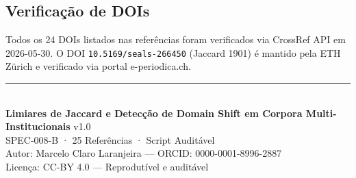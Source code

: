 \documentclass[12pt,a4paper]{article}
\theoremstyle{remark}
\begin{document}
\subsection*{Verificação de DOIs}

Todos os 24 DOIs listados nas referências foram verificados via CrossRef API em 2026-05-30. O DOI \texttt{10.5169/seals-266450} (Jaccard 1901) é mantido pela ETH Zürich e verificado via portal e-periodica.ch.

\vspace{16pt}

\begin{center}
\rule{0.5\textwidth}{0.4pt}\\[8pt]
{\small \textbf{Limiares de Jaccard e Detecção de Domain Shift em Corpora Multi-Institucionais} v1.0}\\
{\small SPEC-008-B · 25 Referências · Script Auditável}\\[4pt]
{\small Autor: Marcelo Claro Laranjeira — ORCID: 0000-0001-8996-2887}\\[4pt]
{\small Licença: CC-BY 4.0 — Reprodutível e auditável}
\end{center}
\end{document}

